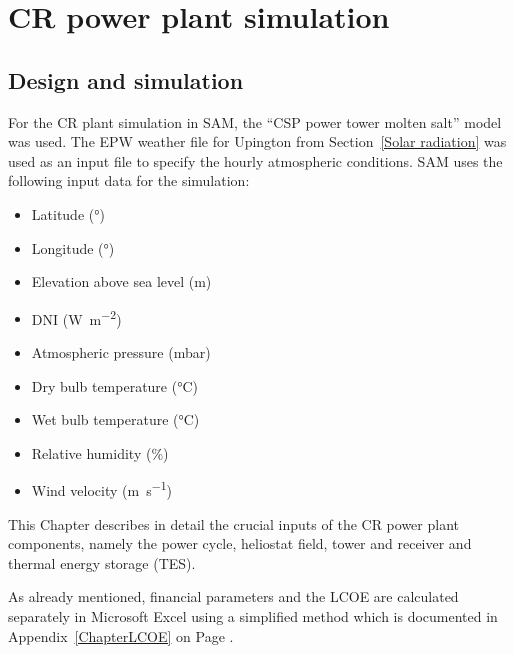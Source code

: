 \chapter{CR power plant simulation}
\section{Design  and simulation} \label{CR power plant design  and simulation}
For the CR plant simulation in SAM, the \enquote{CSP power tower molten salt} model was used. The EPW weather file for Upington from Section~\ref{Solar radiation} was used as an input file to specify the hourly atmospheric conditions. SAM uses the following input data for the simulation:
\begin{itemize}
\item Latitude (\si{\degree})
\item Longitude (\si{\degree})
\item Elevation above sea level (\si{\metre})
\item DNI (\si{\watt\per\square\metre})
\item Atmospheric pressure (\si{\milli\bar})
\item Dry bulb temperature (\si{\celsius})
\item Wet bulb temperature (\si{\celsius})
\item Relative humidity (\si{\percent})
\item Wind velocity (\si{\metre\per\second})
\end{itemize}
This Chapter describes in detail the crucial inputs of the CR power plant components, namely the power cycle, heliostat field, tower and receiver and thermal energy storage (TES).

As already mentioned, financial parameters and the LCOE are calculated separately in Microsoft Excel using a simplified method which is documented in Appendix~\ref{ChapterLCOE} on Page \pageref{ChapterLCOE}.

